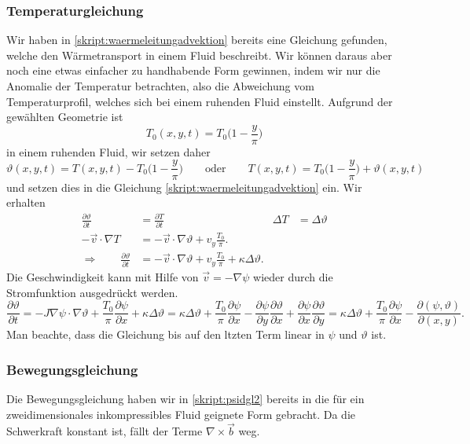 \subsubsection{Temperaturgleichung}
Wir haben in \eqref{skript:waermeleitungadvektion}
bereits eine Gleichung gefunden, welche den Wärmetransport in einem 
Fluid beschreibt.
Wir können daraus aber noch eine etwas einfacher zu handhabende Form
gewinnen, indem wir nur die Anomalie der Temperatur betrachten, also
die Abweichung vom Temperaturprofil, welches sich bei einem ruhenden
Fluid einstellt. 
Aufgrund der gewählten Geometrie ist 
\[
T_0(x,y,t)= T_0\biggl(1- \frac{y}{\pi}\biggr)
\]
in einem ruhenden Fluid, wir setzen daher
\[
\vartheta(x,y,t)
= 
T(x,y,t)
-
T_0\biggl(1-\frac{y}{\pi}\biggr)
\qquad\text{oder}\qquad
T(x,y,t)
=
T_0\biggl(1-\frac{y}{\pi}\biggr)
+
\vartheta(x,y,t)
\]
und setzen dies in die Gleichung \eqref{skript:waermeleitungadvektion}
ein.
Wir erhalten
\begin{align*}
\frac{\partial\vartheta}{\partial t}
&=
\frac{\partial T}{\partial t}
&
\Delta T
&=
\Delta \vartheta
\\
-\vec{v}\cdot\nabla T
&=
-\vec{v}\cdot\nabla\vartheta
+v_y\frac{T_0}{\pi}.
\\
\Rightarrow
\qquad
\frac{\partial\vartheta}{\partial t}
&=
-\vec{v}\cdot\nabla \vartheta
+v_y\frac{T_0}{\pi}
+
\kappa\Delta \vartheta.
\end{align*}
Die Geschwindigkeit kann mit Hilfe von $\vec{v}=-\nabla \psi$ wieder
durch die Stromfunktion ausgedrückt werden.
\begin{equation}
\frac{\partial\vartheta}{\partial t}
=
-J\nabla\psi\cdot\nabla\vartheta
+\frac{T_0}{\pi}\frac{\partial\psi}{\partial x}
+\kappa\Delta\vartheta
=
\kappa\Delta\vartheta
+\frac{T_0}{\pi}\frac{\partial\psi}{\partial x}
-\frac{\partial \psi}{\partial y}\frac{\partial \vartheta}{\partial x}
+\frac{\partial \psi}{\partial x}\frac{\partial \vartheta}{\partial y}
=
\kappa\Delta\vartheta
+\frac{T_0}{\pi}\frac{\partial\psi}{\partial x}
-
\frac{\partial(\psi,\vartheta)}{\partial(x,y)}.
\label{skript:lorenzthetagl}
\end{equation}
Man beachte, dass die Gleichung bis auf den ltzten Term linear 
in $\psi$ und $\vartheta$ ist.

\subsubsection{Bewegungsgleichung}
Die Bewegungsgleichung haben wir in
\eqref{skript:psidgl2}
bereits in die für ein zweidimensionales inkompressibles Fluid
geignete Form gebracht.
Da die Schwerkraft konstant ist, fällt der Terme $\nabla\times\vec{b}$
weg.

